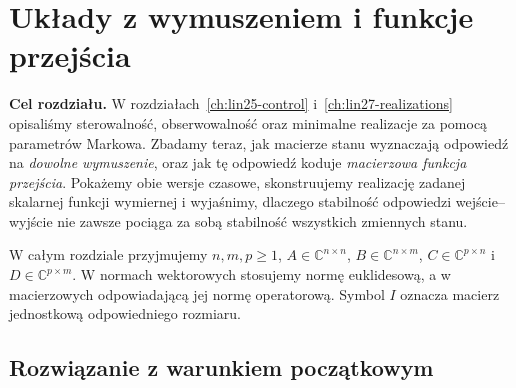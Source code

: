 \chapter{Układy z wymuszeniem i funkcje przejścia}
\label{ch:lin28-transfer}

\noindent\textbf{Cel rozdziału.}
W rozdziałach~\ref{ch:lin25-control} i~\ref{ch:lin27-realizations}
opisaliśmy sterowalność, obserwowalność oraz minimalne realizacje
za pomocą parametrów Markowa. Zbadamy teraz, jak macierze
stanu wyznaczają odpowiedź na \emph{dowolne wymuszenie},
oraz jak tę odpowiedź koduje \emph{macierzowa funkcja przejścia}.
Pokażemy obie wersje czasowe, skonstruujemy realizację
zadanej skalarnej funkcji wymiernej i wyjaśnimy, dlaczego
stabilność odpowiedzi wejście--wyjście nie zawsze pociąga
za sobą stabilność wszystkich zmiennych stanu.

W całym rozdziale przyjmujemy
\(n,m,p\ge1\), \(A\in\mathbb C^{n\times n}\),
\(B\in\mathbb C^{n\times m}\),
\(C\in\mathbb C^{p\times n}\) i
\(D\in\mathbb C^{p\times m}\).
W normach wektorowych stosujemy normę euklidesową,
a w macierzowych odpowiadającą jej normę operatorową.
Symbol \(I\) oznacza macierz jednostkową odpowiedniego rozmiaru.

\section{Rozwiązanie z warunkiem początkowym}
\label{sec:lin28-variation}

